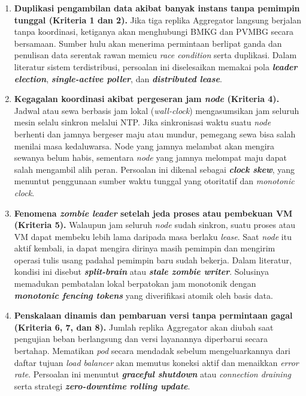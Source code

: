 \begin{enumerate}
  \item \textbf{Duplikasi pengambilan data akibat banyak instans tanpa pemimpin tunggal (Kriteria 1 dan 2).}
  Jika tiga replika Aggregator langsung berjalan tanpa koordinasi, ketiganya akan menghubungi BMKG dan PVMBG secara bersamaan. Sumber hulu akan menerima permintaan berlipat ganda dan penulisan data serentak rawan memicu \textit{race condition} serta duplikasi. Dalam literatur sistem terdistribusi, persoalan ini diselesaikan memakai pola \textbf{\textit{leader election}}, \textbf{\textit{single-active poller}}, dan \textbf{\textit{distributed lease}}.

  \item \textbf{Kegagalan koordinasi akibat pergeseran jam \textit{node} (Kriteria 4).}
  Jadwal atau sewa berbasis jam lokal (\textit{wall-clock}) mengasumsikan jam seluruh mesin selalu sinkron melalui NTP. Jika sinkronisasi waktu suatu \textit{node} berhenti dan jamnya bergeser maju atau mundur, pemegang sewa bisa salah menilai masa kedaluwarsa. Node yang jamnya melambat akan mengira sewanya belum habis, sementara \textit{node} yang jamnya melompat maju dapat salah mengambil alih peran. Persoalan ini dikenal sebagai \textbf{\textit{clock skew}}, yang menuntut penggunaan sumber waktu tunggal yang otoritatif dan \textit{monotonic clock}.

  \item \textbf{Fenomena \textit{zombie leader} setelah jeda proses atau pembekuan VM (Kriteria 5).}
  Walaupun jam seluruh \textit{node} sudah sinkron, suatu proses atau VM dapat membeku lebih lama daripada masa berlaku \textit{lease}. Saat \textit{node} itu aktif kembali, ia dapat mengira dirinya masih pemimpin dan mengirim operasi tulis usang padahal pemimpin baru sudah bekerja. Dalam literatur, kondisi ini disebut \textbf{\textit{split-brain}} atau \textbf{\textit{stale zombie writer}}. Solusinya memadukan pembatalan lokal berpatokan jam monotonik dengan \textbf{\textit{monotonic fencing tokens}} yang diverifikasi atomik oleh basis data.

  \item \textbf{Penskalaan dinamis dan pembaruan versi tanpa permintaan gagal (Kriteria 6, 7, dan 8).}
  Jumlah replika Aggregator akan diubah saat pengujian beban berlangsung dan versi layanannya diperbarui secara bertahap. Mematikan \textit{pod} secara mendadak sebelum mengeluarkannya dari daftar tujuan \textit{load balancer} akan memutus koneksi aktif dan menaikkan \textit{error rate}. Persoalan ini menuntut \textbf{\textit{graceful shutdown}} atau \textit{connection draining} serta strategi \textbf{\textit{zero-downtime rolling update}}.
\end{enumerate}

